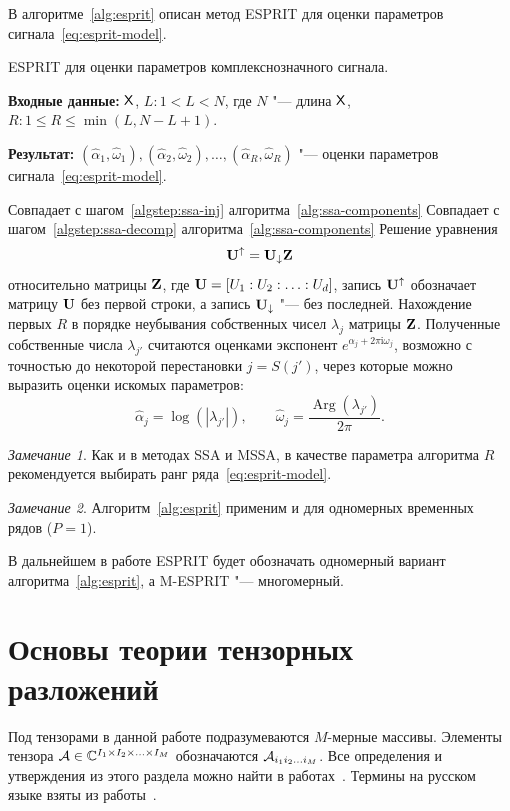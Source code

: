\documentclass[specialist,
  substylefile=spbu_report.rtx,
subf,href,colorlinks=true, 12pt]{disser}
\theoremstyle{plain}
\theoremstyle{definition}
\theoremstyle{remark}
\newtheorem{remark}{Замечание}[section]
\newcommand{\Input}{\textbf{Входные данные: }}
\newcommand{\Output}{\textbf{Результат: }}
\newcommand{\iu}{\mathrm{i}}
\begin{document}
В алгоритме~\ref{alg:esprit} описан метод ESPRIT для оценки параметров
сигнала~\eqref{eq:esprit-model}.
\begin{algorithm}[!ht]
  \caption{ESPRIT для оценки параметров комплекснозначного сигнала.}
  \label{alg:esprit}
  \Input $\mathsf{X}$, $L: 1 < L < N$, где $N$ "--- длина $\mathsf{X}$, $R: 1
  \leqslant R\leqslant \min(L, N-L+1)$.

  \Output $\left(\widehat{\alpha}_1, \widehat{\omega}_1\right),
  \left(\widehat{\alpha}_2, \widehat{\omega}_2\right), \ldots,
  \left(\widehat{\alpha}_R, \widehat{\omega}_R\right)$ "--- оценки параметров
  сигнала~\eqref{eq:esprit-model}.
  \begin{algorithmic}[1]
    \State Совпадает с шагом~\ref{algstep:ssa-inj}
    алгоритма~\ref{alg:ssa-components}
    \State Совпадает с шагом~\ref{algstep:ssa-decomp}
    алгоритма~\ref{alg:ssa-components}
    \State Решение уравнения
    \[
      \mathbf{U}^{\uparrow}=\mathbf{U}_{\downarrow}\mathbf{Z}
    \]
    относительно матрицы $\mathbf{Z}$, где $\mathbf{U} = [U_1:U_2:\ldots: U_d]$,
    запись $\mathbf{U}^{\uparrow}$ обозначает матрицу $\mathbf{U}$ без первой строки, а
    запись $\mathbf{U}_{\downarrow}$ "--- без последней.
    \State Нахождение первых $R$ в порядке неубывания собственных
    чисел $\lambda_j$ матрицы $\mathbf{Z}$.
    Полученные собственные числа $\lambda_{j'}$ считаются оценками
    экспонент $e^{\alpha_j + 2\pi\iu \omega_j}$, возможно с точностью
    до некоторой перестановки
    $j = S (j')$, через которые можно выразить
    оценки искомых параметров:
    \[
      \widehat{\alpha}_j = \log\left(\left|\lambda_{j'}\right|\right), \qquad
      \widehat{\omega}_j =
      \frac{\operatorname{Arg}\left(\lambda_{j'}\right)}{2 \pi}.
    \]
  \end{algorithmic}
\end{algorithm}
\begin{remark}
  Как и в методах SSA и MSSA, в качестве параметра алгоритма $R$
  рекомендуется выбирать ранг
  ряда~\eqref{eq:esprit-model}.
\end{remark}
\begin{remark}
  Алгоритм~\ref{alg:esprit} применим и для одномерных временных рядов ($P=1$).
\end{remark}

В дальнейшем в работе ESPRIT будет обозначать одномерный вариант
алгоритма~\ref{alg:esprit}, а M-ESPRIT "--- многомерный.

\section{Основы теории тензорных разложений}\label{sec:tensor-decompositions}
Под тензорами в данной работе подразумеваются $M$-мерные массивы.
Элементы тензора $\mathcal{A} \in \mathbb{C}^{I_1 \times I_2 \times \ldots \times
I_M}$ обозначаются
$\mathcal{A}_{i_1 i_2 \ldots i_M}$.
Все определения и утверждения из этого раздела можно найти в
работах~\cite{Kilmer2011, hosvd, tensor-bg, tensor-bg2, tensor-bg3,Kilmer2013}.
Термины на русском языке взяты из работы~\cite{tensor-rus}.
\end{document}
